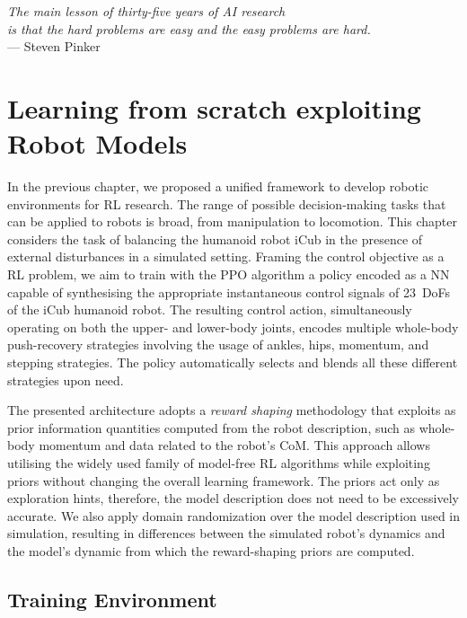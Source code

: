 \begin{flushright}
    \textsl{\onehalfspacing
    The main lesson of thirty-five years of AI research\\
    is that the hard problems are easy and the easy problems are hard.}\\
    --- Steven Pinker
\end{flushright}

\chapter{Learning from scratch exploiting Robot Models}
\label{ch:learning_from_scratch}

In the previous chapter, we proposed a unified framework to develop robotic environments for \ac{RL} research.
The range of possible decision-making tasks that can be applied to robots is broad, from manipulation to locomotion.
This chapter considers the task of balancing the humanoid robot iCub in the presence of external disturbances in a simulated setting.
Framing the control objective as a \ac{RL} problem, we aim to train with the \ac{PPO} algorithm a policy encoded as a \ac{NN} capable of synthesising the appropriate instantaneous control signals of 23~\acp{DoF} of the iCub humanoid robot.
The resulting control action, simultaneously operating on both the upper- and lower-body joints, encodes multiple whole-body push-recovery strategies involving the usage of ankles, hips, momentum, and stepping strategies.
The policy automatically selects and blends all these different strategies upon need.

The presented architecture adopts a \emph{reward shaping} methodology that exploits as prior information quantities computed from the robot description, such as whole-body momentum and data related to the robot's \ac{CoM}.
This approach allows utilising the widely used family of model-free \ac{RL} algorithms while exploiting priors without changing the overall learning framework.
The priors act only as exploration hints, therefore, the model description does not need to be excessively accurate.
We also apply domain randomization over the model description used in simulation, resulting in differences between the simulated robot's dynamics and the model's dynamic from which the reward-shaping priors are computed.

\pagebreak
\section{Training Environment}

